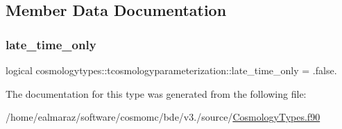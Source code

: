 \subsection{Member Data Documentation}
\mbox{\label{structcosmologytypes_1_1tcosmologyparameterization_ad7eef04da8966b4362c7c8611a66dc38}} 
\subsubsection{\texorpdfstring{late\+\_\+time\+\_\+only}{late\_time\_only}}
{\footnotesize\ttfamily logical cosmologytypes\+::tcosmologyparameterization\+::late\+\_\+time\+\_\+only = .false.}



The documentation for this type was generated from the following file\+:\begin{DoxyCompactItemize}
\item 
/home/ealmaraz/software/cosmomc/bde/v3./source/\mbox{\hyperlink{CosmologyTypes_8f90}{Cosmology\+Types.\+f90}}\end{DoxyCompactItemize}
